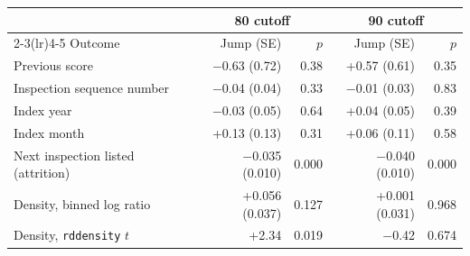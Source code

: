 \begin{tabular}{lrrrr}
\toprule
& \multicolumn{2}{c}{80 cutoff} & \multicolumn{2}{c}{90 cutoff} \\
\cmidrule(lr){2-3}\cmidrule(lr){4-5}
Outcome & Jump (SE) & $p$ & Jump (SE) & $p$ \\
\midrule
Previous score & $-$0.63 (0.72) & 0.38 & +0.57 (0.61) & 0.35 \\
Inspection sequence number & $-$0.04 (0.04) & 0.33 & $-$0.01 (0.03) & 0.83 \\
Index year & $-$0.03 (0.05) & 0.64 & +0.04 (0.05) & 0.39 \\
Index month & +0.13 (0.13) & 0.31 & +0.06 (0.11) & 0.58 \\
Next inspection listed (attrition) & $-$0.035 (0.010) & 0.000 & $-$0.040 (0.010) & 0.000 \\
Density, binned log ratio & +0.056 (0.037) & 0.127 & +0.001 (0.031) & 0.968 \\
Density, \texttt{rddensity} $t$ & +2.34 & 0.019 & $-$0.42 & 0.674 \\
\bottomrule
\end{tabular}
